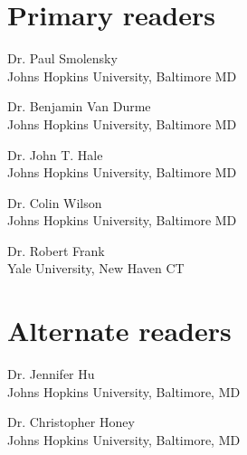 
\begin{singlespace}

    \section*{Primary readers}
    
    Dr. Paul Smolensky \\
    Johns Hopkins University, Baltimore MD 

    \vspace{0.1in}

    Dr. Benjamin Van Durme \\
    Johns Hopkins University, Baltimore MD

    \vspace{0.1in}

    Dr. John T. Hale \\
    Johns Hopkins University, Baltimore MD 

    \vspace{0.1in}

    Dr. Colin Wilson \\
    Johns Hopkins University, Baltimore MD

    \vspace{0.1in}

    Dr. Robert Frank \\
    Yale University, New Haven CT 

    \section*{Alternate readers}
    
    Dr. Jennifer Hu\\
    Johns Hopkins University, Baltimore, MD 
    
    \vspace{0.1in}
    
    Dr. Christopher Honey \\
    Johns Hopkins University, Baltimore, MD 



\end{singlespace}